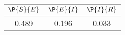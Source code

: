 \begin{tabular}{ccc}
\hline
$\P{S}{E}$&$\P{E}{I}$&$\P{I}{R}$\\
\hline
0.489&0.196&0.033\\
\hline
\end{tabular}